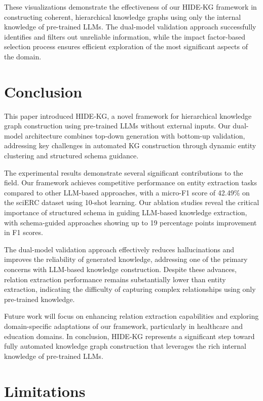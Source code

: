 \documentclass[11pt]{article}
\begin{document}
These visualizations demonstrate the effectiveness of our HIDE-KG framework in constructing coherent, hierarchical knowledge graphs using only the internal knowledge of pre-trained LLMs. The dual-model validation approach successfully identifies and filters out unreliable information, while the impact factor-based selection process ensures efficient exploration of the most significant aspects of the domain.

\section{Conclusion}

This paper introduced HIDE-KG, a novel framework for hierarchical knowledge graph construction using pre-trained LLMs without external inputs. Our dual-model architecture combines top-down generation with bottom-up validation, addressing key challenges in automated KG construction through dynamic entity clustering and structured schema guidance.

The experimental results demonstrate several significant contributions to the field. Our framework achieves competitive performance on entity extraction tasks compared to other LLM-based approaches, with a micro-F1 score of 42.49\% on the sciERC dataset using 10-shot learning. Our ablation studies reveal the critical importance of structured schema in guiding LLM-based knowledge extraction, with schema-guided approaches showing up to 19 percentage points improvement in F1 scores.

The dual-model validation approach effectively reduces hallucinations and improves the reliability of generated knowledge, addressing one of the primary concerns with LLM-based knowledge construction. Despite these advances, relation extraction performance remains substantially lower than entity extraction, indicating the difficulty of capturing complex relationships using only pre-trained knowledge.

Future work will focus on enhancing relation extraction capabilities and exploring domain-specific adaptations of our framework, particularly in healthcare and education domains. In conclusion, HIDE-KG represents a significant step toward fully automated knowledge graph construction that leverages the rich internal knowledge of pre-trained LLMs.

\section*{Limitations}
\end{document}
